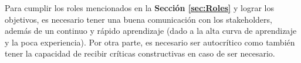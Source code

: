 Para cumplir los roles mencionados en la \textbf{Sección \ref{sec:Roles}} y lograr los objetivos, es necesario tener una buena comunicación con los stakeholders, además de un continuo y rápido aprendizaje (dado a la alta curva de aprendizaje y la poca experiencia). Por otra parte, es necesario ser autocrítico como también tener la capacidad de recibir críticas constructivas en caso de ser necesario.